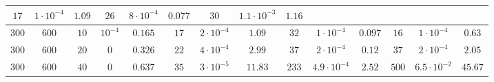 \documentclass[twocolumn]{svjour3}
\begin{document}
\begin{table*}[!htp]
\begin{center}
\begin{tabular}{|c|c|c|c|c|c|c|c|c|c|c|c|c|c|}
\multicolumn{1}{|c}{$17$} & \multicolumn{1}{c}{$1\cdot 10^{-4}$} & \multicolumn{1}{c|}{$1.09$} &
\multicolumn{1}{|c}{$26$} & \multicolumn{1}{c}{$8\cdot 10^{-4}$} & \multicolumn{1}{c|}{$\mathbf{0.077}$} &
\multicolumn{1}{|c}{$30$} & \multicolumn{1}{c}{$1.1\cdot 10^{-3}$} & \multicolumn{1}{c}{$1.16$} \\
\hline
\multicolumn{1}{c}{$300$} & \multicolumn{1}{c}{$600$} & \multicolumn{1}{c}{$10$} & \multicolumn{1}{c|}{$10^{-4}$} & $0.165$ & 
\multicolumn{1}{|c}{$17$} & \multicolumn{1}{c}{$2\cdot 10^{-4}$} & \multicolumn{1}{c|}{$1.09$} &
\multicolumn{1}{|c}{$32$} & \multicolumn{1}{c}{$1\cdot 10^{-4}$} & \multicolumn{1}{c|}{$\mathbf{0.097}$} &
\multicolumn{1}{|c}{$16$} & \multicolumn{1}{c}{$1\cdot 10^{-4}$} & \multicolumn{1}{c}{$0.63$} \\
\hline
\multicolumn{1}{c}{$300$} & \multicolumn{1}{c}{$600$} & \multicolumn{1}{c}{$20$} & \multicolumn{1}{c|}{$0$} & $0.326$ & 
\multicolumn{1}{|c}{$22$} & \multicolumn{1}{c}{$4\cdot 10^{-4}$} & \multicolumn{1}{c|}{$2.99$} &
\multicolumn{1}{|c}{$37$} & \multicolumn{1}{c}{$2\cdot 10^{-4}$} & \multicolumn{1}{c|}{$\mathbf{0.12}$} &
\multicolumn{1}{|c}{$37$} & \multicolumn{1}{c}{$2\cdot 10^{-4}$} & \multicolumn{1}{c}{$2.05$} \\
\hline
\multicolumn{1}{c}{$300$} & \multicolumn{1}{c}{$600$} & \multicolumn{1}{c}{$40$} & \multicolumn{1}{c|}{$0$} & $0.637$ & 
\multicolumn{1}{|c}{$35$} & \multicolumn{1}{c}{$3 \cdot 10^{-5}$} & \multicolumn{1}{c|}{$11.83$} &
\multicolumn{1}{|c}{$233$} & \multicolumn{1}{c}{$4.9\cdot 10^{-4}$} & \multicolumn{1}{c|}{$\mathbf{2.52}$} &
\multicolumn{1}{|c}{$500$} & \multicolumn{1}{c}{$6.5\cdot 10^{-2}$} & \multicolumn{1}{c}{$45.67$} \\


\end{tabular}
\end{center}
\end{table*}
\end{document}
